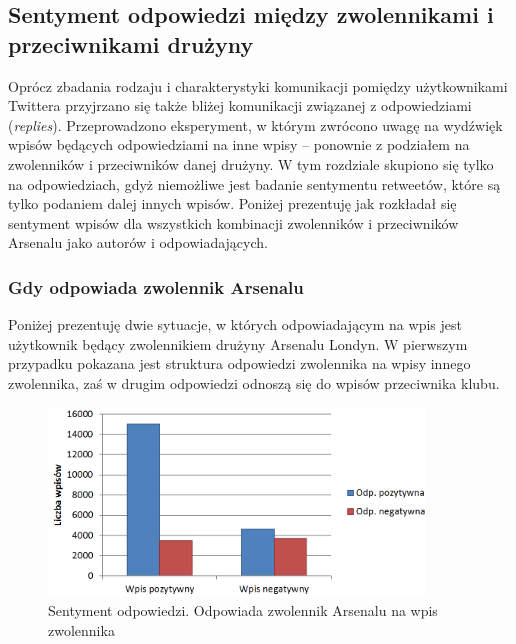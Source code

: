 \subsection{Sentyment odpowiedzi między zwolennikami i przeciwnikami drużyny}
\label{subsection:sentymentwrelacjach}
Oprócz zbadania rodzaju i charakterystyki komunikacji pomiędzy użytkownikami 
Twittera przyjrzano się także bliżej komunikacji związanej z odpowiedziami 
(\textit{replies}). Przeprowadzono eksperyment, w którym zwrócono uwagę
na wydźwięk wpisów będących odpowiedziami na inne wpisy -- ponownie z podziałem
na zwolenników i przeciwników danej drużyny. W tym rozdziale skupiono się tylko
na odpowiedziach, gdyż niemożliwe jest badanie sentymentu retweetów, które są
tylko podaniem dalej innych wpisów. Poniżej prezentuję jak rozkładał się
sentyment wpisów dla wszystkich kombinacji zwolenników i przeciwników
Arsenalu jako autorów i odpowiadających.


\subsubsection{Gdy odpowiada zwolennik Arsenalu}
Poniżej prezentuję dwie sytuacje, w których odpowiadającym na wpis jest
użytkownik będący zwolennikiem drużyny Arsenalu Londyn. W pierwszym przypadku
 pokazana jest struktura
odpowiedzi zwolennika na wpisy innego zwolennika, zaś w drugim
 odpowiedzi odnoszą się do
wpisów przeciwnika klubu.

\begin{figure}[ht!]
\centering
\includegraphics[width=100mm]{img/reply-sentiment-zwolennik-zwolennik.png}
\caption{Sentyment odpowiedzi. Odpowiada zwolennik Arsenalu na wpis zwolennika}
\label{image:reply-sentiment-zwolennik-zwolennik}
\end{figure}


